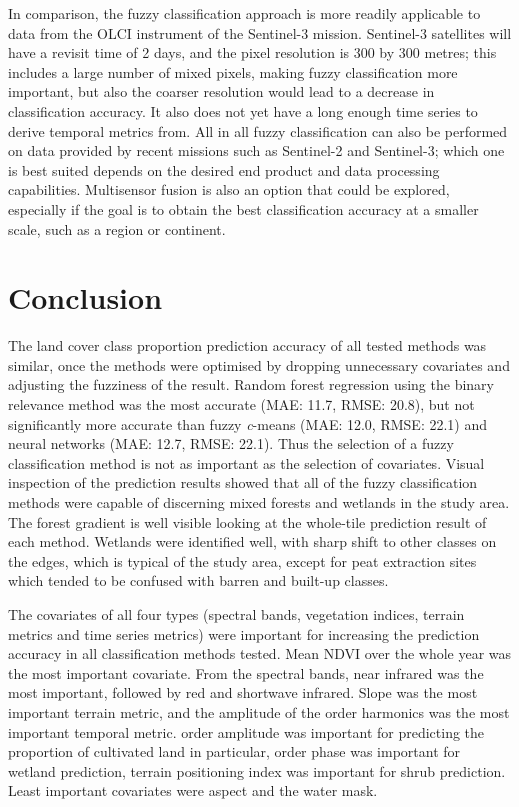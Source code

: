 \documentclass[a4paper,12pt]{scrbook}
\begin{document}
In comparison, the fuzzy classification approach is more readily applicable to data from the OLCI instrument of the Sentinel-3 mission. Sentinel-3 satellites will have a revisit time of 2 days, and the pixel resolution is 300 by 300 metres; this includes a large number of mixed pixels, making fuzzy classification more important, but also the coarser resolution would lead to a decrease in classification accuracy. It also does not yet have a long enough time series to derive temporal metrics from. All in all fuzzy classification can also be performed on data provided by recent missions such as Sentinel-2 and Sentinel-3; which one is best suited depends on the desired end product and data processing capabilities. Multisensor fusion is also an option that could be explored, especially if the goal is to obtain the best classification accuracy at a smaller scale, such as a region or continent.

\chapter{Conclusion}

The land cover class proportion prediction accuracy of all tested methods was similar, once the methods were optimised by dropping unnecessary covariates and adjusting the fuzziness of the result. Random forest regression using the binary relevance method was the most accurate (MAE: 11.7, RMSE: 20.8), but not significantly more accurate than fuzzy \textit{c}-means (MAE: 12.0, RMSE: 22.1) and neural networks (MAE: 12.7, RMSE: 22.1). Thus the selection of a fuzzy classification method is not as important as the selection of covariates. Visual inspection of the prediction results showed that all of the fuzzy classification methods were capable of discerning mixed forests and wetlands in the study area. The forest gradient is well visible looking at the whole-tile prediction result of each method. Wetlands were identified well, with sharp shift to other classes on the edges, which is typical of the study area, except for peat extraction sites which tended to be confused with barren and built-up classes.

The covariates of all four types (spectral bands, vegetation indices, terrain metrics and time series metrics) were important for increasing the prediction accuracy in all classification methods tested. Mean NDVI over the whole year was the most important covariate. From the spectral bands, near infrared was the most important, followed by red and shortwave infrared. Slope was the most important terrain metric, and the amplitude of the  order harmonics was the most important temporal metric.  order amplitude was important for predicting the proportion of cultivated land in particular,  order phase was important for wetland prediction, terrain positioning index was important for shrub prediction. Least important covariates were aspect and  the water mask.
\end{document}

